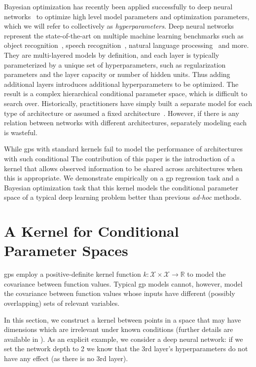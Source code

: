 \documentclass{article}
\newcommand{\sX}{\mathcal{X}}
\newcommand{\gp}{{\sc gp}}
\begin{document}
Bayesian optimization has recently been applied successfully to deep neural networks~\cite{snoek-etal-2012b, BergstraJ2011} to optimize high level model parameters and optimization parameters, which we will refer to collectively as \emph{hyperparameters}.  Deep neural networks represent the state-of-the-art on multiple machine learning benchmarks such as object recognition~\cite{krizhevsky-2012}, speech recognition~\cite{deepSpeechReviewSPM2012}, natural language processing~\cite{mikolov2010recurrent} and more.
They are multi-layered models by definition, and each layer is typically parameterized by a unique set of hyperparameters, such as regularization parameters and the layer capacity or number of hidden units.  Thus adding additional layers introduces additional hyperparameters to be optimized.  The result is a complex hierarchical conditional parameter space, which is difficult to search over.  Historically, practitioners have simply built a separate model for each type of architecture \cite{bergstra2011algorithms} or assumed a fixed architecture~\cite{snoek-etal-2012b}.  However, if there is any relation between networks with different architectures, separately modeling each is wasteful. 

While \gp s with standard kernels fail to model the performance of architectures with such conditional %
The contribution of this paper is the introduction of a kernel that allows observed information to be shared across architectures when this is appropriate. We demonstrate empirically on a \gp{} regression task and a Bayesian optimization task that this kernel models the conditional parameter space of a typical deep learning problem better than previous \emph{ad-hoc} methods. 


\section{A Kernel for Conditional Parameter Spaces}
\vspace{-0.05in} 

\gp{}s employ a positive-definite kernel function $k: \sX \times \sX \rightarrow \mathbb{R}$ to model the covariance between function values. Typical \gp{} models cannot, however, model the covariance between function values whose inputs have different (possibly overlapping) sets of relevant variables.

In this section, we construct a kernel between points in a space that may have dimensions which are irrelevant under known conditions (further details are available in \cite{arxiv_hierarchical_kernel}). As an explicit example, we consider a deep neural network: if we set the network depth to 2 we know that the 3rd layer's hyperparameters do not have any effect (as there is no 3rd layer).
\end{document}
